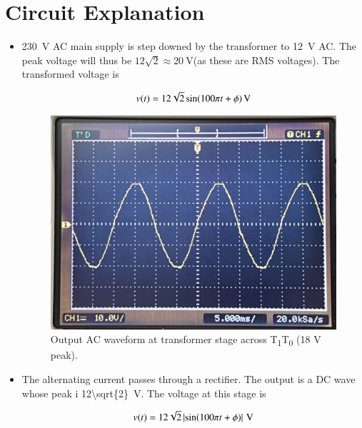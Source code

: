 \documentclass[journal,12pt,twocolumn]{IEEEtran}
\providecommand{\abs}[1]{\left\vert#1\right\vert}
\numberwithin{equation}{section}
\numberwithin{figure}{section}
\begin{document}
	\section{Circuit Explanation}
	\begin{itemize}
	\item \SI{230}{\volt} AC main supply is step downed by the transformer to \SI{12}{\volt} AC. The peak voltage will thus be $12\sqrt{2} \approx \SI{20}{\volt}$(as these are RMS voltages). The transformed voltage is
	
	\begin{align}
		v(t) = \SI[parse-numbers=false]{12\sqrt{2}\sin(100\pi t + \phi)}{\volt}
	\end{align}
	
	\begin{figure}[!ht]
		\centering
		\includegraphics[width=\columnwidth]{./FIGURES/transfomer.jpg}
		\caption{Output AC waveform at transformer stage across T\textsubscript{1}T\textsubscript{0} (18 V peak).}
		\label{fig-transformer}	
	\end{figure}
	
	\item The alternating current passes through a rectifier. The output is a DC wave whose peak i \SI[parse-numbers=false]{12\sqrt{2}}{\volt}. The voltage at this stage is 
	
	\begin{align}
		v(t) = \SI[parse-numbers=false]{12\sqrt{2}\abs{\sin(100\pi t + \phi)}}{\volt}
	\end{align}
	

\end{itemize}
\end{document}
